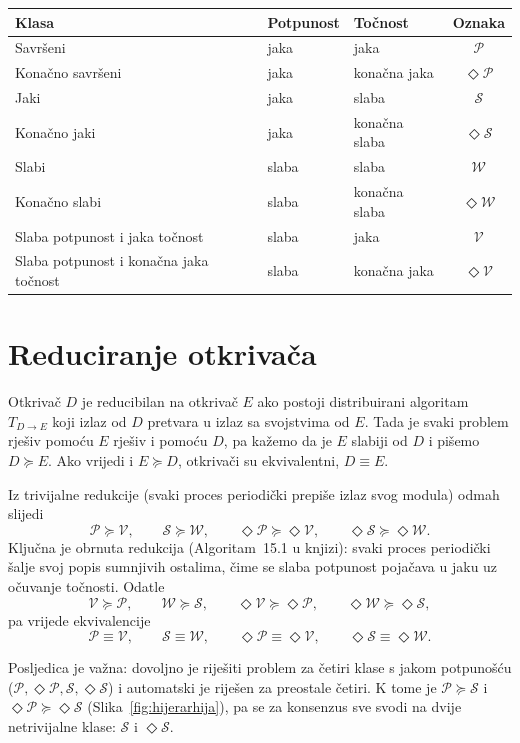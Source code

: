 \documentclass[11pt,a4paper]{article}
\newcommand{\Dp}{\ensuremath{\mathcal{P}}}
\newcommand{\Ds}{\ensuremath{\mathcal{S}}}
\newcommand{\Dw}{\ensuremath{\mathcal{W}}}
\newcommand{\Dv}{\ensuremath{\mathcal{V}}}
\newcommand{\eP}{\ensuremath{\Diamond\mathcal{P}}}
\newcommand{\eS}{\ensuremath{\Diamond\mathcal{S}}}
\newcommand{\eW}{\ensuremath{\Diamond\mathcal{W}}}
\newcommand{\eV}{\ensuremath{\Diamond\mathcal{V}}}
\begin{document}
\begin{table}[H]
\centering
\begin{tabular}{lllc}
\toprule
Klasa & Potpunost & Točnost & Oznaka \\
\midrule
Savršeni              & jaka  & jaka           & \Dp \\
Konačno savršeni      & jaka  & konačna jaka   & \eP \\
Jaki                  & jaka  & slaba          & \Ds \\
Konačno jaki          & jaka  & konačna slaba  & \eS \\
Slabi                 & slaba & slaba          & \Dw \\
Konačno slabi         & slaba & konačna slaba  & \eW \\
Slaba potpunost i jaka točnost                   & slaba & jaka           & \Dv \\
Slaba potpunost i konačna jaka točnost                   & slaba & konačna jaka   & \eV \\
\bottomrule
\end{tabular}
\label{tab:klase}
\end{table}

\section{Reduciranje otkrivača}

Otkrivač $D$ je reducibilan na otkrivač $E$ ako postoji distribuirani algoritam
$T_{D \to E}$ koji izlaz od $D$ pretvara u izlaz sa svojstvima od $E$. Tada je
svaki problem rješiv pomoću $E$ rješiv i pomoću $D$, pa kažemo da je $E$ slabiji
od $D$ i pišemo $D \succeq E$. Ako vrijedi i $E \succeq D$, otkrivači su
ekvivalentni, $D \equiv E$.

Iz trivijalne redukcije (svaki proces periodički prepiše izlaz svog modula) odmah
slijedi
\[
  \Dp \succeq \Dv, \qquad \Ds \succeq \Dw, \qquad
  \eP \succeq \eV, \qquad \eS \succeq \eW.
\]
Ključna je obrnuta redukcija (Algoritam~15.1 u knjizi): svaki proces periodički
šalje svoj popis sumnjivih ostalima, čime se slaba potpunost pojačava u jaku uz
očuvanje točnosti. Odatle
\[
  \Dv \succeq \Dp, \qquad \Dw \succeq \Ds, \qquad
  \eV \succeq \eP, \qquad \eW \succeq \eS,
\]
pa vrijede ekvivalencije
\[
  \Dp \equiv \Dv, \qquad \Ds \equiv \Dw, \qquad
  \eP \equiv \eV, \qquad \eS \equiv \eW.
\]

Posljedica je važna: dovoljno je riješiti problem za četiri klase s jakom
potpunošću ($\Dp, \eP, \Ds, \eS$) i automatski je riješen za preostale četiri. K
tome je $\Dp \succeq \Ds$ i $\eP \succeq \eS$ (Slika~\ref{fig:hijerarhija}), pa se
za konsenzus sve svodi na dvije netrivijalne klase: $\Ds$ i $\eS$.
\end{document}
